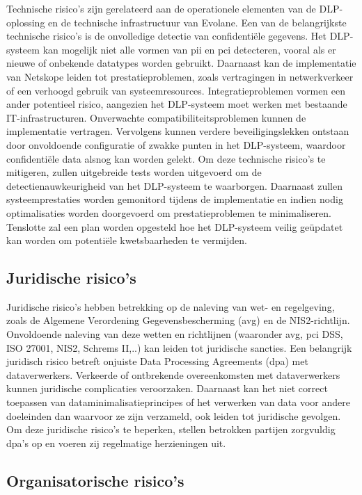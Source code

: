 Technische risico's zijn gerelateerd aan de operationele elementen van de DLP-oplossing en de technische infrastructuur van Evolane.
Een van de belangrijkste technische risico's is de onvolledige detectie van confidentiële gegevens. 
Het DLP-systeem kan mogelijk niet alle vormen van \gls{pii} en \gls{pci} detecteren, vooral als er nieuwe of onbekende datatypes worden gebruikt.
Daarnaast kan de implementatie van Netskope leiden tot prestatieproblemen, zoals vertragingen in netwerkverkeer of een verhoogd gebruik van systeemresources.
Integratieproblemen vormen een ander potentieel risico, aangezien het DLP-systeem moet werken met bestaande IT-infrastructuren.
Onverwachte compatibiliteitsproblemen kunnen de implementatie vertragen. Vervolgens kunnen verdere beveiligingslekken ontstaan 
door onvoldoende configuratie of zwakke punten in het DLP-systeem, waardoor confidentiële data alsnog kan worden gelekt.
Om deze technische risico's te mitigeren, zullen uitgebreide tests worden uitgevoerd om de detectienauwkeurigheid van het DLP-systeem te waarborgen.
Daarnaast zullen systeemprestaties worden gemonitord tijdens de implementatie en indien nodig optimalisaties worden doorgevoerd om prestatieproblemen te minimaliseren.
Tenslotte zal een plan worden opgesteld hoe het DLP-systeem veilig geüpdatet kan worden om potentiële kwetsbaarheden te vermijden.

\subsection{Juridische risico's}

Juridische risico's hebben betrekking op de naleving van wet- en regelgeving, zoals de Algemene Verordening Gegevensbescherming (\gls{avg}) en de NIS2-richtlijn.
Onvoldoende naleving van deze wetten en richtlijnen (waaronder \gls{avg}, \gls{pci} DSS, ISO 27001, NIS2, Schrems II,..) kan leiden tot juridische sancties. 
Een belangrijk juridisch risico betreft onjuiste Data Processing Agreements (\gls{dpa}) met dataverwerkers. 
Verkeerde of ontbrekende overeenkomsten met dataverwerkers kunnen juridische complicaties veroorzaken. 
Daarnaast kan het niet correct toepassen van dataminimalisatieprincipes of het verwerken van data voor andere doeleinden dan waarvoor ze zijn verzameld, 
ook leiden tot juridische gevolgen. 
Om deze juridische risico's te beperken, stellen betrokken partijen zorgvuldig \gls{dpa}'s op en voeren zij regelmatige herzieningen uit.

\subsection{Organisatorische risico's}

